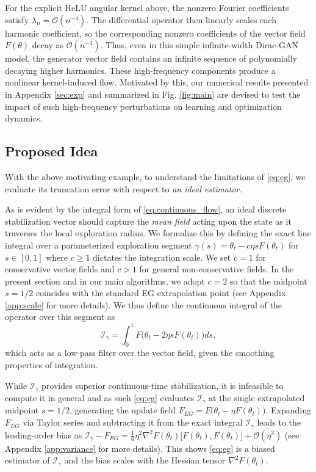 \documentclass[letter,11pt]{article}
\begin{document}
For the explicit ReLU angular kernel above, the nonzero Fourier coefficients satisfy $\lambda_n=\mathcal{O}(n^{-4})$. The differential operator then linearly scales each harmonic coefficient, so the corresponding nonzero coefficients of the vector field $F(\theta)$ decay as $\mathcal{O}(n^{-3})$. Thus, even in this simple infinite-width Dirac-GAN model, the generator vector field contains an infinite sequence of polynomially decaying higher harmonics. These high-frequency components produce a nonlinear kernel-induced flow. Motivated by this, our numerical results presented in Appendix \ref{sec:exp} and summarized in Fig. \ref{fig:main} are devised to test the impact of such high-frequency perturbations on learning and optimization dynamics.
\subsection{Proposed Idea}
With the above motivating example, to understand the limitations of \eqref{eq:eg}, we evaluate its truncation error with respect to \emph{an ideal estimator.}

As is evident by the integral form of \eqref{eq:continuous_flow}, an ideal discrete stabilization vector should capture the \emph{mean field} acting upon the state as it traverses the local exploration radius. We formalize this by defining the exact line integral over a parameterized exploration segment $\gamma(s) = \theta_t - c\eta s F(\theta_t)$ for $s \in [0, 1]$ where $c \ge 1$ dictates the integration scale. We set $c = 1$ for conservative vector fields and $c>1$ for general non-conservative fields. In the present section and in our main algorithms, we adopt $c=2$ so that the midpoint $s=1/2$ coincides with the standard EG extrapolation point (see Appendix \ref{app:scale} for more details). We thus define the continuous integral of the operator over this segment as
\begin{equation} \label{eq:intro_line_integral}
\mathcal{I}_{\gamma} = \int_0^1 F\big(\theta_t - 2\eta s F(\theta_t)\big) ds,
\end{equation}
which acts as a low-pass filter over the vector field, given the smoothing properties of integration.

While $\mathcal{I}_{\gamma}$ provides superior continuous-time stabilization, it is infeasible to compute it in general and as such \eqref{eq:eg} evaluates $\mathcal{I}_{\gamma}$ at the single extrapolated midpoint $s=1/2$, generating the update field $F_{EG} = F\big(\theta_t - \eta F(\theta_t)\big)$. Expanding $F_{EG}$ via Taylor series and subtracting it from the exact integral $\mathcal{I}_{\gamma}$ leads to the leading-order bias as $\mathcal{I}_{\gamma} - F_{EG} = \frac{1}{6}\eta^2 \nabla^2 F(\theta_t)\big[F(\theta_t), F(\theta_t)\big] + \mathcal{O}(\eta^3)$ (see Appendix \ref{app:variance} for more details).
This shows \eqref{eq:eg} is a biased estimator of $\mathcal{I}_{\gamma}$ and the bias scales with the Hessian tensor $\nabla^2 F(\theta_t)$.
\end{document}

